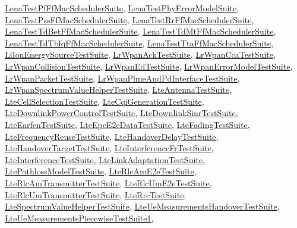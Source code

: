 \hyperlink{classLenaTestPfFfMacSchedulerSuite}{Lena\+Test\+Pf\+Ff\+Mac\+Scheduler\+Suite}, \hyperlink{classLenaTestPhyErrorModelSuite}{Lena\+Test\+Phy\+Error\+Model\+Suite}, \hyperlink{classLenaTestPssFfMacSchedulerSuite}{Lena\+Test\+Pss\+Ff\+Mac\+Scheduler\+Suite}, \hyperlink{classLenaTestRrFfMacSchedulerSuite}{Lena\+Test\+Rr\+Ff\+Mac\+Scheduler\+Suite}, \hyperlink{classLenaTestTdBetFfMacSchedulerSuite}{Lena\+Test\+Td\+Bet\+Ff\+Mac\+Scheduler\+Suite}, \hyperlink{classLenaTestTdMtFfMacSchedulerSuite}{Lena\+Test\+Td\+Mt\+Ff\+Mac\+Scheduler\+Suite}, \hyperlink{classLenaTestTdTbfqFfMacSchedulerSuite}{Lena\+Test\+Td\+Tbfq\+Ff\+Mac\+Scheduler\+Suite}, \hyperlink{classLenaTestTtaFfMacSchedulerSuite}{Lena\+Test\+Tta\+Ff\+Mac\+Scheduler\+Suite}, \hyperlink{classLiIonEnergySourceTestSuite}{Li\+Ion\+Energy\+Source\+Test\+Suite}, \hyperlink{classLrWpanAckTestSuite}{Lr\+Wpan\+Ack\+Test\+Suite}, \hyperlink{classLrWpanCcaTestSuite}{Lr\+Wpan\+Cca\+Test\+Suite}, \hyperlink{classLrWpanCollisionTestSuite}{Lr\+Wpan\+Collision\+Test\+Suite}, \hyperlink{classLrWpanEdTestSuite}{Lr\+Wpan\+Ed\+Test\+Suite}, \hyperlink{classLrWpanErrorModelTestSuite}{Lr\+Wpan\+Error\+Model\+Test\+Suite}, \hyperlink{classLrWpanPacketTestSuite}{Lr\+Wpan\+Packet\+Test\+Suite}, \hyperlink{classLrWpanPlmeAndPdInterfaceTestSuite}{Lr\+Wpan\+Plme\+And\+Pd\+Interface\+Test\+Suite}, \hyperlink{classLrWpanSpectrumValueHelperTestSuite}{Lr\+Wpan\+Spectrum\+Value\+Helper\+Test\+Suite}, \hyperlink{classLteAntennaTestSuite}{Lte\+Antenna\+Test\+Suite}, \hyperlink{classLteCellSelectionTestSuite}{Lte\+Cell\+Selection\+Test\+Suite}, \hyperlink{classLteCqiGenerationTestSuite}{Lte\+Cqi\+Generation\+Test\+Suite}, \hyperlink{classLteDownlinkPowerControlTestSuite}{Lte\+Downlink\+Power\+Control\+Test\+Suite}, \hyperlink{classLteDownlinkSinrTestSuite}{Lte\+Downlink\+Sinr\+Test\+Suite}, \hyperlink{classLteEarfcnTestSuite}{Lte\+Earfcn\+Test\+Suite}, \hyperlink{classLteEpcE2eDataTestSuite}{Lte\+Epc\+E2e\+Data\+Test\+Suite}, \hyperlink{classLteFadingTestSuite}{Lte\+Fading\+Test\+Suite}, \hyperlink{classLteFrequencyReuseTestSuite}{Lte\+Frequency\+Reuse\+Test\+Suite}, \hyperlink{classLteHandoverDelayTestSuite}{Lte\+Handover\+Delay\+Test\+Suite}, \hyperlink{classLteHandoverTargetTestSuite}{Lte\+Handover\+Target\+Test\+Suite}, \hyperlink{classLteInterferenceFrTestSuite}{Lte\+Interference\+Fr\+Test\+Suite}, \hyperlink{classLteInterferenceTestSuite}{Lte\+Interference\+Test\+Suite}, \hyperlink{classLteLinkAdaptationTestSuite}{Lte\+Link\+Adaptation\+Test\+Suite}, \hyperlink{classLtePathlossModelTestSuite}{Lte\+Pathloss\+Model\+Test\+Suite}, \hyperlink{classLteRlcAmE2eTestSuite}{Lte\+Rlc\+Am\+E2e\+Test\+Suite}, \hyperlink{classLteRlcAmTransmitterTestSuite}{Lte\+Rlc\+Am\+Transmitter\+Test\+Suite}, \hyperlink{classLteRlcUmE2eTestSuite}{Lte\+Rlc\+Um\+E2e\+Test\+Suite}, \hyperlink{classLteRlcUmTransmitterTestSuite}{Lte\+Rlc\+Um\+Transmitter\+Test\+Suite}, \hyperlink{classLteRrcTestSuite}{Lte\+Rrc\+Test\+Suite}, \hyperlink{classLteSpectrumValueHelperTestSuite}{Lte\+Spectrum\+Value\+Helper\+Test\+Suite}, \hyperlink{classLteUeMeasurementsHandoverTestSuite}{Lte\+Ue\+Measurements\+Handover\+Test\+Suite}, \hyperlink{classLteUeMeasurementsPiecewiseTestSuite1}{Lte\+Ue\+Measurements\+Piecewise\+Test\+Suite1}, 